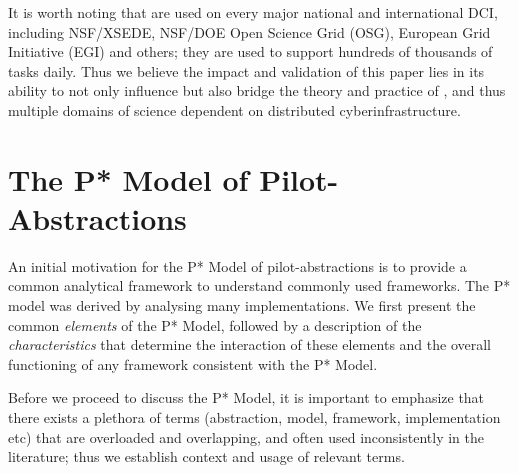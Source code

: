 \documentclass[conference]{IEEEtran}
\begin{document}
It is worth noting that \pilotjobs are used on every major national
and international DCI, including NSF/XSEDE, NSF/DOE Open Science Grid
(OSG), European Grid Initiative (EGI) and others; they are used to
support hundreds of thousands of tasks daily. Thus we believe the
impact and validation of this paper lies in its ability to not only
influence but also bridge the theory and practice of \pilotjobs, and
thus multiple domains of science dependent on distributed
cyberinfrastructure.






\section{The P* Model of Pilot-\\Abstractions}
\label{sec:pilot-model}

An initial motivation for the P* Model of pilot-abstractions is to
provide a common analytical framework to understand commonly
used \pilotjob frameworks.  The P* model was derived by analysing many
\pilotjob implementations.  We first present
the common {\it elements} of the P* Model, followed by a description
of the {\it characteristics} that determine the interaction of these
elements and the overall functioning of any \pilotjob framework 
consistent with the P* Model.  

Before we proceed to discuss the P* Model, it is important to
emphasize that there exists a plethora of terms (abstraction,
model, framework, implementation etc) that are overloaded and
overlapping, and often used inconsistently in the literature;
thus we establish context and usage of relevant terms.
\end{document}
